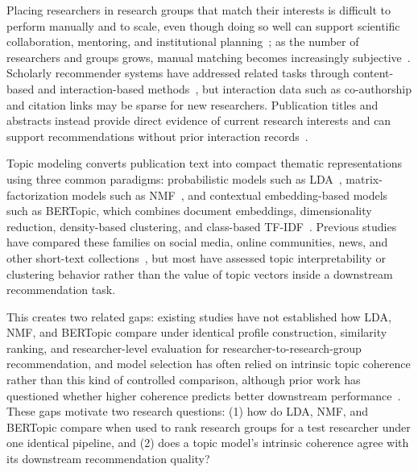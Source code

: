 Placing researchers in research groups that match their interests is difficult to perform manually and to scale, even though doing so well can support scientific collaboration, mentoring, and institutional planning~\cite{yang2014multilevel,sun2015raf}; as the number of researchers and groups grows, manual matching becomes increasingly subjective~\cite{zhang2023scholarly}. Scholarly recommender systems have addressed related tasks through content-based and interaction-based methods~\cite{zhang2023scholarly,bai2019scientific}, but interaction data such as co-authorship and citation links may be sparse for new researchers. Publication titles and abstracts instead provide direct evidence of current research interests and can support recommendations without prior interaction records~\cite{bai2019scientific,beel2016research}.

Topic modeling converts publication text into compact thematic representations using three common paradigms: probabilistic models such as LDA~\cite{jelodar2019lda,blei2003lda}, matrix-factorization models such as NMF~\cite{lee2000nmf}, and contextual embedding-based models such as BERTopic, which combines document embeddings, dimensionality reduction, density-based clustering, and class-based TF-IDF~\cite{grootendorst2022bertopic}. Previous studies have compared these families on social media, online communities, news, and other short-text collections~\cite{egger2022topic,kaur2024moving,babalola2024comprehensive}, but most have assessed topic interpretability or clustering behavior rather than the value of topic vectors inside a downstream recommendation task.

This creates two related gaps: existing studies have not established how LDA, NMF, and BERTopic compare under identical profile construction, similarity ranking, and researcher-level evaluation for researcher-to-research-group recommendation, and model selection has often relied on intrinsic topic coherence rather than this kind of controlled comparison, although prior work has questioned whether higher coherence predicts better downstream performance~\cite{roder2015exploring,rudiger2022topic}. These gaps motivate two research questions: (1) how do LDA, NMF, and BERTopic compare when used to rank research groups for a test researcher under one identical pipeline, and (2) does a topic model's intrinsic coherence agree with its downstream recommendation quality?

